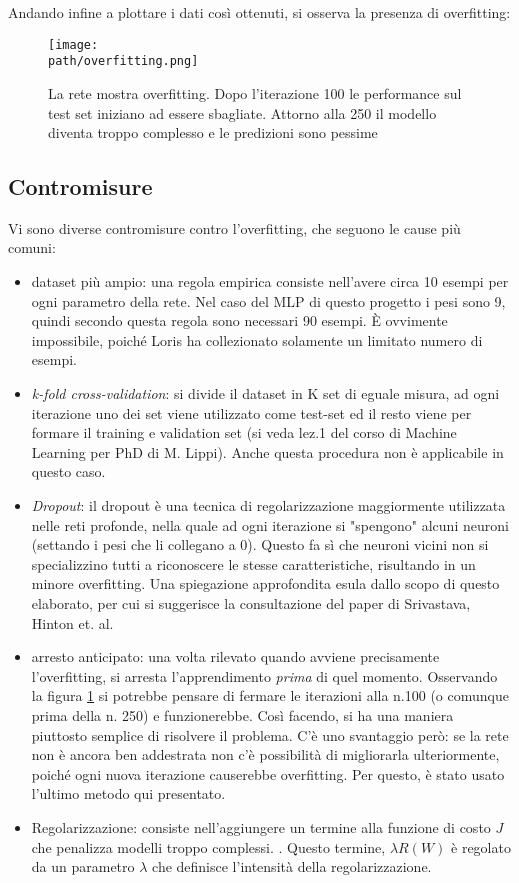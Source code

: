 Andando infine a plottare i dati così ottenuti, si osserva la presenza di overfitting: 
\begin{figure}[h!]
 \centering
 \texttt{[image: \\path/overfitting.png]}
 \caption{La rete mostra overfitting. Dopo l'iterazione 100 le performance sul test set iniziano ad essere sbagliate. Attorno alla 250 il modello diventa troppo complesso e le predizioni sono pessime}
 \label{fig:overfitting}
\end{figure}


\subsection{Contromisure}
Vi sono diverse contromisure contro l'overfitting, che seguono le cause più comuni: 
\begin{itemize}
\item dataset più ampio: una regola empirica consiste nell'avere circa 10 esempi per ogni parametro della rete. Nel caso del MLP di questo progetto i pesi sono 9, quindi secondo questa regola sono necessari 90 esempi. È ovvimente impossibile, poiché Loris ha collezionato solamente un limitato numero di esempi. 
\item \emph{k-fold cross-validation}: si divide il dataset in K set di eguale misura, ad ogni iterazione uno dei set viene utilizzato come test-set ed il resto viene per formare il training e validation set (si veda lez.1 del corso di Machine Learning per PhD di M. Lippi). Anche questa procedura non è applicabile in questo caso. 
\item \emph{Dropout}: il dropout è una tecnica di regolarizzazione maggiormente utilizzata nelle reti profonde, nella quale ad ogni iterazione si "spengono" alcuni neuroni (settando i pesi che li collegano a 0). Questo fa sì che neuroni vicini non si specializzino tutti a riconoscere le stesse caratteristiche, risultando in un minore overfitting. Una spiegazione approfondita esula dallo scopo di questo elaborato, per cui si suggerisce la consultazione del paper di Srivastava, Hinton et. al\parencite{Dropout}.  
\item arresto anticipato: una volta rilevato quando avviene precisamente l'overfitting, si arresta l'apprendimento \emph{prima} di quel momento. Osservando la figura \ref{fig:overfitting} si potrebbe pensare di fermare le iterazioni alla n.100 (o comunque prima della n. 250) e funzionerebbe. Così facendo, si ha una maniera piuttosto semplice di risolvere il problema. C'è uno svantaggio però: se la rete non è ancora ben addestrata non c'è possibilità di migliorarla ulteriormente, poiché ogni nuova iterazione causerebbe overfitting. Per questo, è stato usato l'ultimo metodo qui presentato. 
\item Regolarizzazione: consiste nell'aggiungere un termine alla funzione di costo $J$ che penalizza modelli troppo complessi. \parencite{WLippi}. Questo termine, $\lambda R(W)$ è regolato da un parametro $\lambda$ che definisce l'intensità della regolarizzazione. 
\end{itemize}

